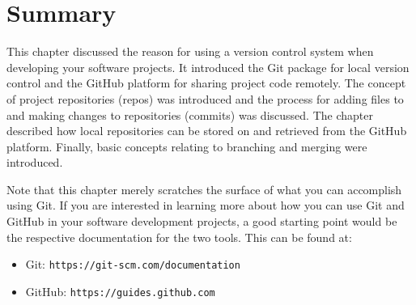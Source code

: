 \documentclass{book}
\begin{document}
\section{Summary}
This chapter discussed the reason for using a version control system when developing your software projects. It introduced the Git package for local version control and the GitHub platform for sharing project code remotely. The concept of project repositories (repos) was introduced and the process for adding files to and making changes to repositories (commits) was discussed. The chapter described how local repositories can be stored on and retrieved from the GitHub platform. Finally, basic concepts relating to branching and merging were introduced.

Note that this chapter merely scratches the surface of what you can accomplish using Git. If you are interested in learning more about how you can use Git and GitHub in your software development projects, a good starting point would be the respective documentation for the two tools. This can be found at:

\begin{itemize}
	\item Git: \texttt{https://git-scm.com/documentation}
	\item GitHub: \texttt{https://guides.github.com}
\end{itemize}
\end{document}

